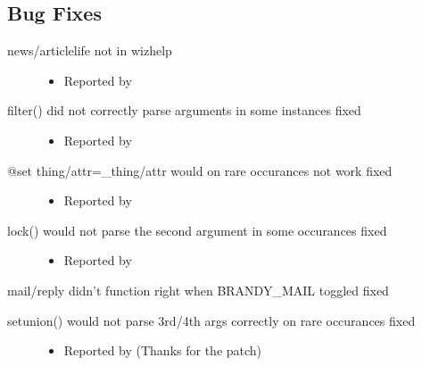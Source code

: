 \documentclass[letterpaper,10pt,english]{sphinxmanual}
\begin{document}
\subsection{Bug Fixes}
\label{\detokenize{changelog:id82}}\begin{description}
\item[{news/articlelife not in wizhelp}] \leavevmode\begin{itemize}
\item {} 
\sphinxAtStartPar
Reported by 

\end{itemize}

\item[{filter() did not correctly parse arguments in some instances \textendash{} fixed}] \leavevmode\begin{itemize}
\item {} 
\sphinxAtStartPar
Reported by 

\end{itemize}

\item[{@set thing/attr=\_thing/attr would on rare occurances not work \textendash{} fixed}] \leavevmode\begin{itemize}
\item {} 
\sphinxAtStartPar
Reported by 

\end{itemize}

\item[{lock() would not parse the second argument in some occurances \textendash{} fixed}] \leavevmode\begin{itemize}
\item {} 
\sphinxAtStartPar
Reported by 

\end{itemize}

\end{description}

\sphinxAtStartPar
mail/reply didn’t function right when BRANDY\_MAIL toggled \textendash{} fixed
\begin{description}
\item[{setunion() would not parse 3rd/4th args correctly on rare occurances \textendash{}fixed}] \leavevmode\begin{itemize}
\item {} 
\sphinxAtStartPar
Reported by  (Thanks for the patch)

\end{itemize}

\end{description}
\end{document}
